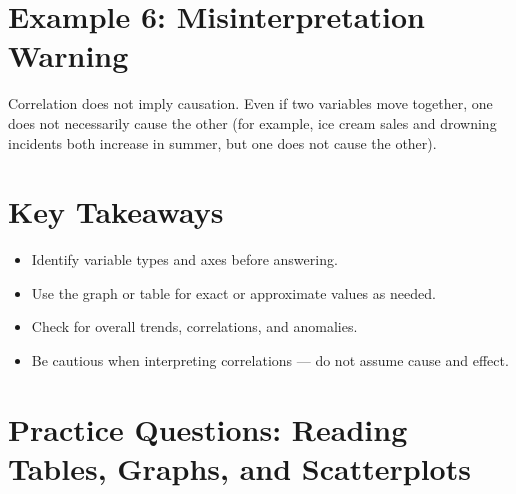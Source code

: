 \documentclass[12pt]{article}
\begin{document}
\section*{Example 6: Misinterpretation Warning}

Correlation does not imply causation.  
Even if two variables move together, one does not necessarily cause the other (for example, ice cream sales and drowning incidents both increase in summer, but one does not cause the other).

\section*{Key Takeaways}
\begin{itemize}
  \item Identify variable types and axes before answering.
  \item Use the graph or table for exact or approximate values as needed.
  \item Check for overall trends, correlations, and anomalies.
  \item Be cautious when interpreting correlations — do not assume cause and effect.
\end{itemize}

\newpage


\section*{Practice Questions: Reading Tables, Graphs, and Scatterplots}
\end{document}
